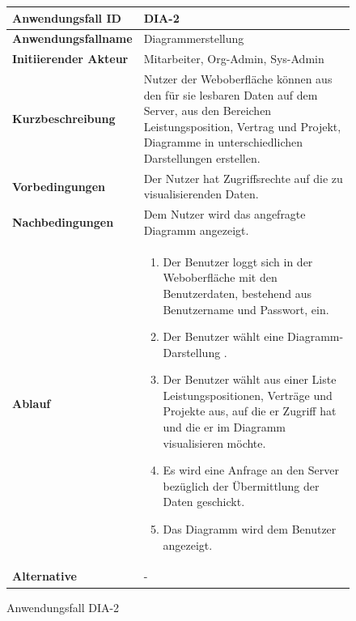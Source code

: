 \begin{figure}[h]
	\centering
	\begin{tabularx}{\textwidth}{ X | X }
		\textbf{Anwendungsfall ID} & DIA-2 \\ \hline
		\textbf{Anwendungsfallname} & Diagrammerstellung\\ \hline
		\textbf{Initiierender Akteur} & Mitarbeiter, Org-Admin, Sys-Admin \\ \hline
		\textbf{Kurzbeschreibung} & Nutzer der Weboberfläche können aus den für sie lesbaren Daten auf dem Server, aus den Bereichen Leistungsposition, Vertrag und Projekt, Diagramme in unterschiedlichen Darstellungen erstellen.  \\ \hline
		\textbf{Vorbedingungen} & Der Nutzer hat Zugriffsrechte auf die zu visualisierenden Daten.  \\ \hline
		\textbf{Nachbedingungen} &  Dem Nutzer wird das angefragte Diagramm angezeigt.  \\ \hline
		\textbf{Ablauf} &
		\begin{enumerate}
			\item Der Benutzer loggt sich in der Weboberfläche mit den Benutzerdaten, bestehend aus Benutzername und Passwort, ein.
			\item Der Benutzer wählt eine Diagramm-Darstellung .
			\item Der Benutzer wählt aus einer Liste Leistungspositionen, Verträge und Projekte aus, auf die er Zugriff hat und die er im Diagramm visualisieren möchte.
			\item Es wird eine Anfrage an den Server bezüglich der Übermittlung der Daten geschickt.
			\item Das Diagramm wird dem Benutzer angezeigt.
		\end{enumerate} \\ \hline

		\textbf{Alternative} & - \\ \hline
	\end{tabularx}
	\caption{Anwendungsfall DIA-2}
	\label{fig:anwendungsfall-DIA-2}
	
	
\end{figure}


\newpage

